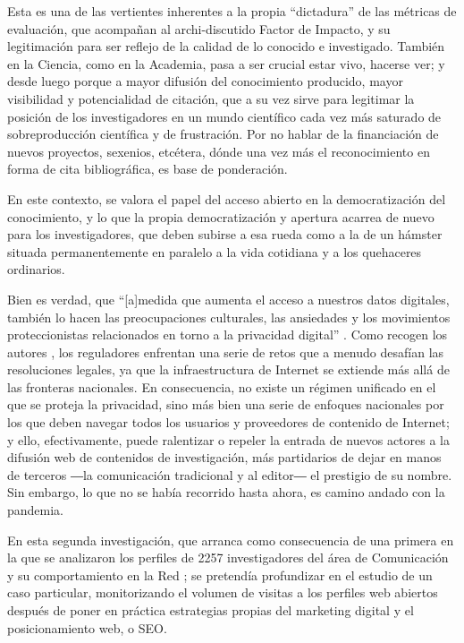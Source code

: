 \documentclass{textolivre}
\begin{document}
Esta es una de las vertientes inherentes a la propia “dictadura” de las métricas de evaluación, que acompañan al archi-discutido Factor de Impacto, y su legitimación para ser reflejo de la calidad de lo conocido e investigado.
También en la Ciencia, como en la Academia, pasa a ser crucial estar vivo, hacerse ver; y desde luego porque a mayor difusión del conocimiento producido, mayor visibilidad y potencialidad de citación, que a su vez sirve para legitimar la posición de los investigadores en un mundo científico cada vez más saturado de sobreproducción científica y de frustración. Por no hablar de la financiación de nuevos proyectos, sexenios, etcétera, dónde una vez más el reconocimiento en forma de cita bibliográfica, es base de ponderación.

En este contexto, se valora el papel del acceso abierto en la democratización del conocimiento, y lo que la propia democratización y apertura acarrea de nuevo para los investigadores, que deben subirse a esa rueda como a la de un hámster situada permanentemente en paralelo a la vida cotidiana y a los quehaceres ordinarios.

Bien es verdad, que “[a]medida que aumenta el acceso a nuestros datos digitales, también lo hacen las preocupaciones culturales, las ansiedades y los movimientos proteccionistas relacionados en torno a la privacidad digital” \cite[p. 155]{holt_privacy_2015}. Como recogen los autores \cite{holt_privacy_2015}, los reguladores enfrentan una serie de retos que a menudo desafían las resoluciones legales, ya que la infraestructura de Internet se extiende más allá de las fronteras nacionales. En consecuencia, no existe un régimen unificado en el que se proteja la privacidad, sino más bien una serie de enfoques nacionales por los que deben navegar todos los usuarios y proveedores de contenido de Internet; y ello, efectivamente, puede ralentizar o repeler la entrada de nuevos actores a la difusión web de contenidos de investigación, más partidarios de dejar en manos de terceros ―la comunicación tradicional y al editor― el prestigio de su nombre. Sin embargo, lo que no se había recorrido hasta ahora, es camino andado con la pandemia.

En esta segunda investigación, que arranca como consecuencia de una primera en la que se analizaron los perfiles de 2257 investigadores del área de Comunicación y su comportamiento en la Red \cite{mandia-rubal_implantacion_2019}; se pretendía profundizar en el estudio de un caso particular, monitorizando el volumen de visitas a los perfiles web abiertos después de poner en práctica estrategias propias del marketing digital y el posicionamiento web, o SEO.
\end{document}
